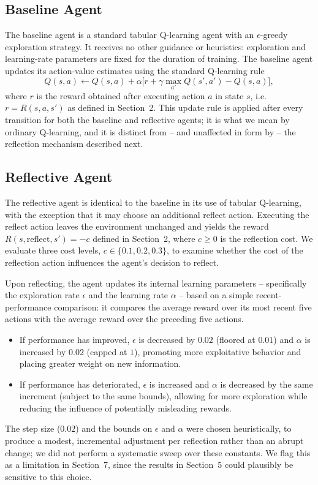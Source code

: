 \documentclass[11pt]{article}
\begin{document}
\subsection{Baseline Agent}

The baseline agent is a standard tabular Q-learning agent with an $\epsilon$-greedy exploration strategy. It receives no other guidance or heuristics: exploration and learning-rate parameters are fixed for the duration of training. The baseline agent updates its action-value estimates using the standard Q-learning rule
\[
Q(s,a) \leftarrow Q(s,a) + \alpha\big[r + \gamma \max_{a'} Q(s',a') - Q(s,a)\big],
\]
where $r$ is the reward obtained after executing action $a$ in state $s$, i.e. $r = R(s,a,s')$ as defined in Section~2. This update rule is applied after every transition for both the baseline and reflective agents; it is what we mean by ordinary Q-learning, and it is distinct from -- and unaffected in form by -- the reflection mechanism described next.

\subsection{Reflective Agent}

The reflective agent is identical to the baseline in its use of tabular Q-learning, with the exception that it may choose an additional reflect action. Executing the reflect action leaves the environment unchanged and yields the reward $R(s,\text{reflect},s') = -c$ defined in Section~2, where $c \geq 0$ is the reflection cost. We evaluate three cost levels, $c \in \{0.1, 0.2, 0.3\}$, to examine whether the cost of the reflection action influences the agent's decision to reflect.

Upon reflecting, the agent updates its internal learning parameters -- specifically the exploration rate $\epsilon$ and the learning rate $\alpha$ -- based on a simple recent-performance comparison: it compares the average reward over its most recent five actions with the average reward over the preceding five actions.
\begin{itemize}
\item If performance has improved, $\epsilon$ is decreased by $0.02$ (floored at $0.01$) and $\alpha$ is increased by $0.02$ (capped at $1$), promoting more exploitative behavior and placing greater weight on new information.
\item If performance has deteriorated, $\epsilon$ is increased and $\alpha$ is decreased by the same increment (subject to the same bounds), allowing for more exploration while reducing the influence of potentially misleading rewards.
\end{itemize}
The step size ($0.02$) and the bounds on $\epsilon$ and $\alpha$ were chosen heuristically, to produce a modest, incremental adjustment per reflection rather than an abrupt change; we did not perform a systematic sweep over these constants. We flag this as a limitation in Section~7, since the results in Section~5 could plausibly be sensitive to this choice.
\end{document}

